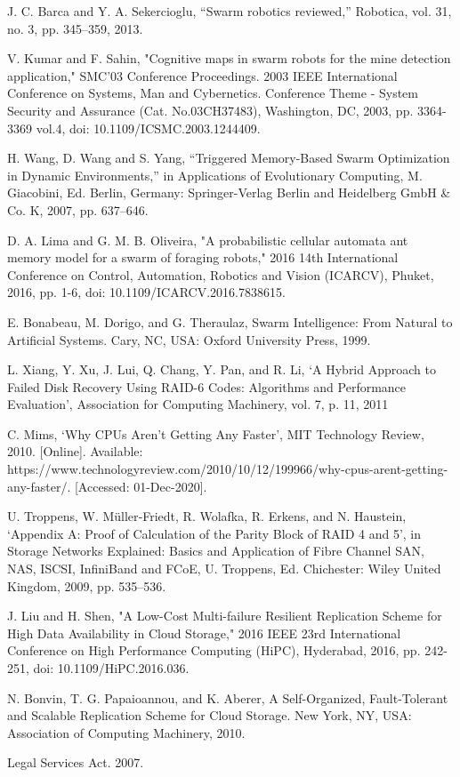 \documentclass{UoYCSproject}
\begin{document}
\begin{thebibliography}{100}
J. C. Barca and Y. A. Sekercioglu, “Swarm robotics reviewed,” Robotica, vol. 31, no. 3, pp. 345–359, 2013.

V. Kumar and F. Sahin, "Cognitive maps in swarm robots for the mine detection application," SMC'03 Conference Proceedings. 2003 IEEE International Conference on Systems, Man and Cybernetics. Conference Theme - System Security and Assurance (Cat. No.03CH37483), Washington, DC, 2003, pp. 3364-3369 vol.4, doi: 10.1109/ICSMC.2003.1244409.

H. Wang, D. Wang and S. Yang, “Triggered Memory-Based Swarm Optimization in Dynamic Environments,” in Applications of Evolutionary Computing, M. Giacobini, Ed. Berlin, Germany: Springer-Verlag Berlin and Heidelberg GmbH \& Co. K, 2007, pp. 637–646.

D. A. Lima and G. M. B. Oliveira, "A probabilistic cellular automata ant memory model for a swarm of foraging robots," 2016 14th International Conference on Control, Automation, Robotics and Vision (ICARCV), Phuket, 2016, pp. 1-6, doi: 10.1109/ICARCV.2016.7838615.

E. Bonabeau, M. Dorigo, and G. Theraulaz, Swarm Intelligence: From Natural to Artificial Systems. Cary, NC, USA: Oxford University Press, 1999.

L. Xiang, Y. Xu, J. Lui, Q. Chang, Y. Pan, and R. Li, ‘A Hybrid Approach to Failed Disk Recovery Using RAID-6 Codes: Algorithms and Performance Evaluation’, Association for Computing Machinery, vol. 7, p. 11, 2011

C. Mims, ‘Why CPUs Aren’t Getting Any Faster’, MIT Technology Review, 2010. [Online]. Available: https://www.technologyreview.com/2010/10/12/199966/why-cpus-arent-getting-any-faster/. [Accessed: 01-Dec-2020].

U. Troppens, W. Müller‐Friedt, R. Wolafka, R. Erkens, and N. Haustein, ‘Appendix A: Proof of Calculation of the Parity Block of RAID 4 and 5’, in Storage Networks Explained: Basics and Application of Fibre Channel SAN, NAS, ISCSI, InfiniBand and FCoE, U. Troppens, Ed. Chichester: Wiley United Kingdom, 2009, pp. 535–536.

J. Liu and H. Shen, "A Low-Cost Multi-failure Resilient Replication Scheme for High Data Availability in Cloud Storage," 2016 IEEE 23rd International Conference on High Performance Computing (HiPC), Hyderabad, 2016, pp. 242-251, doi: 10.1109/HiPC.2016.036.

N. Bonvin, T. G. Papaioannou, and K. Aberer, A Self-Organized, Fault-Tolerant and Scalable Replication Scheme for Cloud Storage. New York, NY, USA: Association of Computing Machinery, 2010.

Legal Services Act. 2007.

\end{thebibliography}
\end{document}
